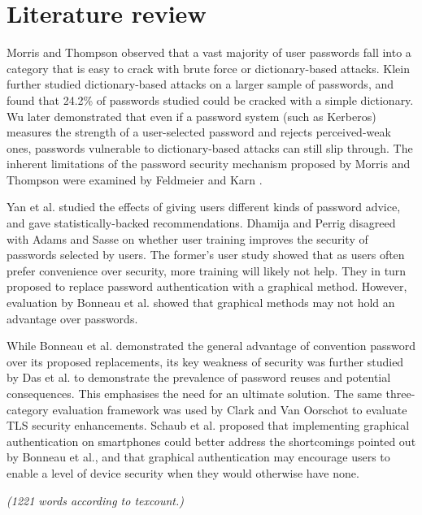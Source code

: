 \documentclass[11pt]{article}
\begin{document}
\section{Literature review}

Morris and Thompson \cite[p. 596]{morris1979password} observed that a vast majority of user passwords fall into a category that is easy to crack with brute force or dictionary-based attacks. Klein \cite{klein1990foiling} further studied dictionary-based attacks on a larger sample of passwords, and found that 24.2\% of passwords studied could be cracked with a simple dictionary. Wu later \cite{wu1999real} demonstrated that even if a password system (such as Kerberos) measures the strength of a user-selected password and rejects perceived-weak ones, passwords vulnerable to dictionary-based attacks can still slip through. The inherent limitations of the password security mechanism proposed by Morris and Thompson were examined by Feldmeier and Karn \cite{feldmeier1989unix}.

Yan et al. \cite{yan2004password} studied the effects of giving users different kinds of password advice, and gave statistically-backed recommendations. Dhamija and Perrig \cite[Sec. 5]{dhamija2000deja} disagreed with Adams and Sasse \cite{adams1999users} on whether user training improves the security of passwords selected by users. The former's user study showed that as users often prefer convenience over security, more training will likely not help. They in turn proposed to replace password authentication with a graphical method. However, evaluation by Bonneau et al. \cite[Sec. IV, D]{bonneau2012quest} showed that graphical methods may not hold an advantage over passwords. 

While Bonneau et al. \cite{bonneau2012quest} demonstrated the general advantage of convention password over its proposed replacements, its key weakness of security was further studied by Das et al. \cite{das2014tangled} to demonstrate the prevalence of password reuses and potential consequences. This emphasises the need for an ultimate solution. The same three-category evaluation framework was used by Clark and Van Oorschot \cite{clark2013sok} to evaluate TLS security enhancements. Schaub et al. \cite{schaub2013exploring} proposed that implementing graphical authentication on smartphones could better address the shortcomings pointed out by Bonneau et al., and that graphical authentication may encourage users to enable a level of device security when they would otherwise have none.

\emph{(1221 words according to texcount.)}


\footnotesize{}
\end{document}
